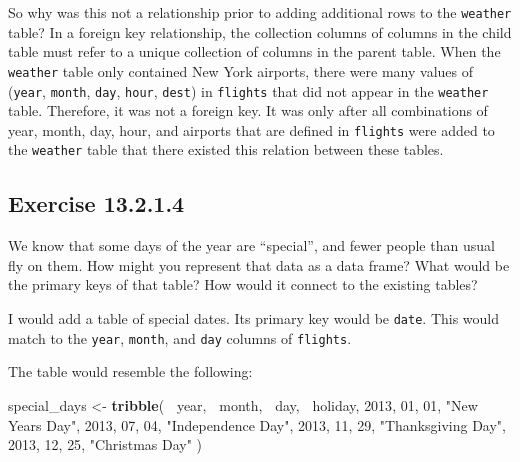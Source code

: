 \documentclass[]{book}
\newenvironment{Shaded}{\begin{snugshade}}{\end{snugshade}}
\newcommand{\DecValTok}[1]{\textcolor[rgb]{0.00,0.00,0.81}{#1}}
\newcommand{\KeywordTok}[1]{\textcolor[rgb]{0.13,0.29,0.53}{\textbf{#1}}}
\newcommand{\NormalTok}[1]{#1}
\newcommand{\OperatorTok}[1]{\textcolor[rgb]{0.81,0.36,0.00}{\textbf{#1}}}
\newcommand{\StringTok}[1]{\textcolor[rgb]{0.31,0.60,0.02}{#1}}
\theoremstyle{plain}
\theoremstyle{remark}
\begin{document}
So why was this not a relationship prior to adding additional rows to
the \texttt{weather} table? In a foreign key relationship, the
collection columns of columns in the child table must refer to a unique
collection of columns in the parent table. When the \texttt{weather}
table only contained New York airports, there were many values of
(\texttt{year}, \texttt{month}, \texttt{day}, \texttt{hour},
\texttt{dest}) in \texttt{flights} that did not appear in the
\texttt{weather} table. Therefore, it was not a foreign key. It was only
after all combinations of year, month, day, hour, and airports that are
defined in \texttt{flights} were added to the \texttt{weather} table
that there existed this relation between these tables.

\hypertarget{exercise-13.2.1.4}{%
\subsection*{\texorpdfstring{Exercise
{13.2.1.4}}{Exercise 13.2.1.4}}\label{exercise-13.2.1.4}}

We know that some days of the year are ``special'', and fewer people
than usual fly on them. How might you represent that data as a data
frame? What would be the primary keys of that table? How would it
connect to the existing tables?

I would add a table of special dates. Its primary key would be
\texttt{date}. This would match to the \texttt{year}, \texttt{month},
and \texttt{day} columns of \texttt{flights}.

The table would resemble the following:

\begin{Shaded}
\begin{Highlighting}[]
\NormalTok{special_days <-}\StringTok{ }\KeywordTok{tribble}\NormalTok{(}
  \OperatorTok{~}\NormalTok{year, }\OperatorTok{~}\NormalTok{month, }\OperatorTok{~}\NormalTok{day, }\OperatorTok{~}\NormalTok{holiday,}
  \DecValTok{2013}\NormalTok{, }\DecValTok{01}\NormalTok{, }\DecValTok{01}\NormalTok{, }\StringTok{"New Years Day"}\NormalTok{,}
  \DecValTok{2013}\NormalTok{, }\DecValTok{07}\NormalTok{, }\DecValTok{04}\NormalTok{, }\StringTok{"Independence Day"}\NormalTok{,}
  \DecValTok{2013}\NormalTok{, }\DecValTok{11}\NormalTok{, }\DecValTok{29}\NormalTok{, }\StringTok{"Thanksgiving Day"}\NormalTok{,}
  \DecValTok{2013}\NormalTok{, }\DecValTok{12}\NormalTok{, }\DecValTok{25}\NormalTok{, }\StringTok{"Christmas Day"}
\NormalTok{)}
\end{Highlighting}
\end{Shaded}
\end{document}
